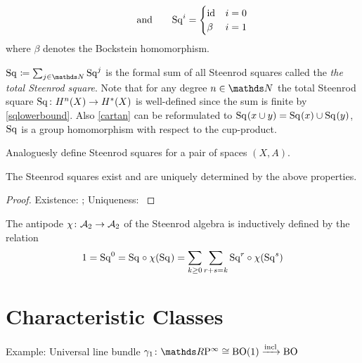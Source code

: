 \begin{Def}
\begin{description}
\begin{gather}
      \qquad\text{and}\qquad
      \mathrm{Sq}^{i} = \begin{cases}
        \mathrm{id}_{} & i=0\\
        \beta & i=1
      \end{cases}
    \end{gather}
    where $\beta$ denotes the Bockstein homomorphism. %
  \end{description}
  $\Sq{}\coloneqq \sum_{j\in\Nat}\Sq j$ is the formal sum of all
  Steenrod squares called the \emph{the total Steenrod square}.
  Note that for any degree $n\in\Nat$ the total Steenrod square
  $\mathrm{Sq}^{}\colon H^n(X)\to H^*(X)$ is well-defined since the sum is
  finite by \eqref{sqlowerbound}.
  Also \ref{cartan} can be reformulated to
  $\mathrm{Sq}^{}(x\cup y) = \mathrm{Sq}^{}(x)\cup\mathrm{Sq}^{}(y)$, \idest $\mathrm{Sq}^{}$ is a group
  homomorphism with respect to the cup-product.

  Analoguesly define Steenrod squares for a pair of spaces $(X,A)$.
\end{Def}

\begin{Thm}
  The Steenrod squares exist and are uniquely determined by the above
  properties.
  \begin{proof} %
    Existence: \cite[Chapter 2]{mosher};
    Uniqueness: \cite[VIII §3]{steenrodepstein}
  \end{proof}
\end{Thm}

\begin{Def}%
\end{Def}

\begin{Def}
  The antipode $\chi\colon \mathcal{A}_2\to\mathcal{A}_2$ of the Steenrod algebra is
  inductively defined by the relation
  \begin{gather*}
    1 = \mathrm{Sq}^{0}
    = \mathrm{Sq}^{} \circ \chi(\mathrm{Sq}^{})
    = \sum_{k\geq0}\sum_{r+s=k} \mathrm{Sq}^{r} \circ \chi(\mathrm{Sq}^{s})
  \end{gather*}
\end{Def}

\section{Characteristic Classes}
\begin{Def} %
  Example: Universal line bundle $\gamma_1\colon \RP\cong\BO(1)\xrightarrow{\incl} \BO$
\end{Def}

